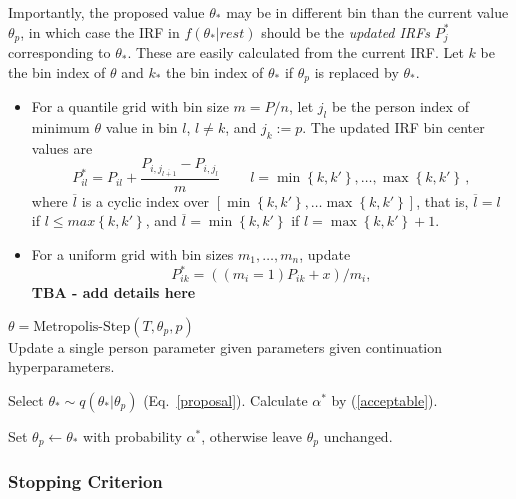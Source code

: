 \documentclass{article}
\newcommand{\ta}{\theta}
\begin{document}
Importantly, the proposed value $\ta_*$ may be in different bin than the current value $\ta_p$, in which case the IRF in $f(\ta_*|rest)$ should be the {\it updated IRFs} $P^*_j$ corresponding to $\ta_*$. These are easily calculated from the current IRF. Let $k$ be the bin index of $\theta$ and $k_*$ the bin index of $\ta_*$ if $\ta_p$ is replaced by $\ta_*$. 

\begin{itemize}
	\item For a quantile grid with bin size $m = P/n$, let $j_l$ be the person index of minimum $\theta$ value in bin $l$, $l \not = k$, and
	$j_k := p$. The updated IRF bin center values are
	\begin{equation}
		P^*_{il} = P_{il} + \frac{P_{i,j_{\overline{l+1}}} - P_{i,j_l}}{m}\,\qquad
		l = \min\left\{ k,k' \right\}, \dots, \max\left\{ k, k' \right\}\,,
	\end{equation}
	where  $\overline{l}$ is a cyclic index over $[\min\left\{k,k'\right\},\dots\max\left\{k,k'\right\}]$, that is,
	$\overline{l} = l$ if $l \leq max\left\{k,k'\right\}$, and $\overline{l} =  \min\left\{k,k'\right\}$ if $l =  \max\left\{k,k'\right\}+1$.
	
	\item For a uniform grid with bin sizes $m_1,\dots,m_n$, update
	$$ P^*_{ik} = ((m_i=1) P_{ik} + x) / m_i,  $$
	{\bf TBA - add details here}
\end{itemize}

 


\begin{algorithm}
\caption[]{$\ta = {\mbox{Metropolis-Step}}(T, \ta_p, p)$\\\hspace{\textwidth}
Update a single person parameter given parameters given continuation hyperparameters.}
\begin{algorithmic}
	\label{metropolis_step}
    \STATE Select $\ta_* \sim q(\ta_*|\ta_p)$ (Eq.~\ref{proposal}).
	\STATE Calculate $\alpha^*$ by (\ref{acceptable}).
	\item Set $\ta_p \leftarrow \ta_*$ with probability $\alpha^*$, otherwise leave $\ta_p$ unchanged.
\end{algorithmic}
\end{algorithm}

\subsubsection{Stopping Criterion}
\end{document}
